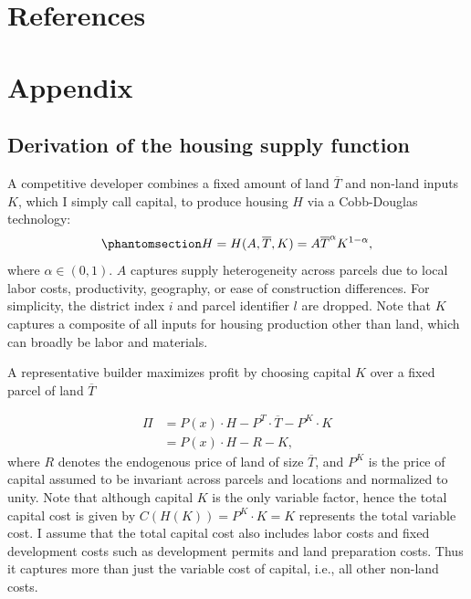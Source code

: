 \documentclass[
  12pt,
]{article}
\begin{document}
\newpage

\section*{References}\label{references}

\renewcommand{\bibsection}{}



\newpage

\section*{Appendix}\label{sec-appendix-hse}

\setcounter{equation}{0}
\setcounter{figure}{0}
\setcounter{table}{0}
\setcounter{section}{1} %
\renewcommand\thesection{\Alph{section}}
\renewcommand\theequation{\thesection.\arabic{equation}}    
\renewcommand\thefigure{\thesection.\arabic{figure}}    
\renewcommand\thetable{\thesection.\arabic{table}}  

\subsection{Derivation of the housing supply
function}\label{sec-hs-appendix}

A competitive developer combines a fixed amount of land \(\overline{T}\)
and non-land inputs \(K\), which I simply call capital, to produce
housing \(H\) via a Cobb-Douglas technology:
\begin{equation}\phantomsection\label{eq-cobb-appendix}{
H = H(A, \overline{T}, K) = A \overline{T}^{\alpha} K^{1-\alpha},
}\end{equation} where \(\alpha \in (0, 1)\). \(A\) captures supply
heterogeneity across parcels due to local labor costs, productivity,
geography, or ease of construction differences. For simplicity, the
district index \(i\) and parcel identifier \(l\) are dropped. Note that
\(K\) captures a composite of all inputs for housing production other
than land, which can broadly be labor and materials.

A representative builder maximizes profit by choosing capital \(K\) over
a fixed parcel of land \(\overline{T}\)

\[
\begin{aligned}
\Pi &= P(x) \cdot H - P^T \cdot \overline{T} - P^K\cdot K\\
&=P(x)\cdot H - R - K,
\end{aligned}
\] where \(R\) denotes the endogenous price of land of size
\(\overline{T}\), and \(P^K\) is the price of capital assumed to be
invariant across parcels and locations and normalized to unity. Note
that although capital \(K\) is the only variable factor, hence the total
capital cost is given by \(C(H(K)) = P^K\cdot K = K\) represents the
total variable cost. I assume that the total capital cost also includes
labor costs and fixed development costs such as development permits and
land preparation costs. Thus it captures more than just the variable
cost of capital, i.e., all other non-land costs.
\end{document}
